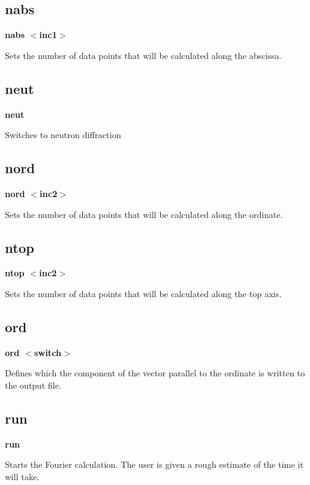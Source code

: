 \subsection*{nabs}
{\bf nabs $ <$inc1$> $ \par }
\par
\vspace{3pt}
Sets the number of data points that will be calculated along the 
abscissa. 
\subsection*{neut}
{\bf neut \par }
\par
\vspace{3pt}
Switches to neutron diffraction 
\subsection*{nord}
{\bf nord $ <$inc2$> $ \par }
\par
\vspace{3pt}
Sets the number of data points that will be calculated along the 
ordinate. 
\subsection*{ntop}
{\bf ntop $ <$inc2$> $ \par }
\par
\vspace{3pt}
Sets the number of data points that will be calculated along the 
top axis. 
\subsection*{ord}
{\bf ord $ <$switch$> $ \par }
\par
\vspace{3pt}
Defines which the component of the vector parallel to the ordinate 
is written to the output file. 
\subsection*{run}
{\bf run \par }
\par
\vspace{3pt}
Starts the Fourier calculation. The user is given a rough 
estimate of the time it will take. 
